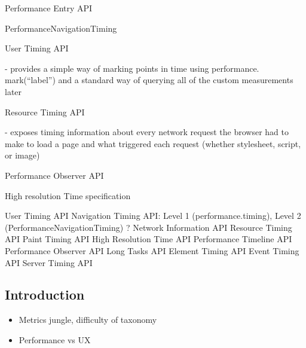 Performance Entry API %





PerformanceNavigationTiming %



User Timing API %

- provides a simple way of marking points in time using performance. mark(“label”) and a standard way of querying all of the custom measurements later




Resource Timing API %

- exposes timing information about every network request the browser had to make to load a page and what triggered each request (whether stylesheet, script, or image)




Performance Observer API %



High resolution Time specification






User Timing API
Navigation Timing API: Level 1 (performance.timing), Level 2 (PerformanceNavigationTiming) ?
Network Information API
Resource Timing API
Paint Timing API
High Resolution Time API
Performance Timeline API
Performance Observer API
Long Tasks API
Element Timing API
Event Timing API
Server Timing API
















\subsection{Introduction}

\begin{itemize}
\item Metrics jungle, difficulty of taxonomy
\item Performance vs UX
\end{itemize}

